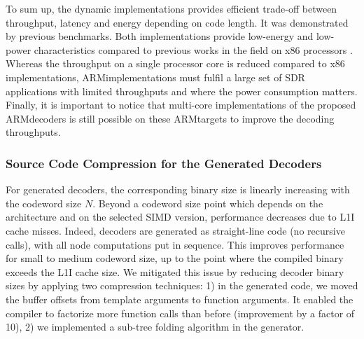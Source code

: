 To sum up, the dynamic implementations provides efficient trade-off between
throughput, latency and energy depending on code length. It was demonstrated by
previous benchmarks. Both implementations provide low-energy and low-power
characteristics compared to previous works in the field on x86 processors
\cite{Sarkis2014,Giard2014,Sarkis2014a,LeGal2014,LeGal2015a,Cassagne2015c}.
Whereas the throughput on a single processor core is reduced compared to x86
implementations, ARM\R implementations must fulfil a large set of SDR
applications with limited throughputs and where the power consumption matters.
Finally, it is important to notice that multi-core implementations of the
proposed ARM\R decoders is still possible on these ARM\R targets to improve the
decoding throughputs.

\subsubsection{Source Code Compression for the Generated Decoders}

For generated decoders, the corresponding binary size is linearly increasing
with the codeword size $N$. Beyond a codeword size point which depends on the
architecture and on the selected SIMD version, performance decreases due to L1I
cache misses. Indeed, decoders are generated as straight-line code (no recursive
calls), with all node computations put in sequence. This improves performance
for small to medium codeword size, up to the point where  the compiled binary
exceeds the L1I cache size.
We mitigated this issue by reducing decoder binary sizes by applying two
compression techniques: 1) in the generated code, we moved the buffer offsets
from template arguments to function arguments. It enabled the compiler to
factorize more function calls than before (improvement by a factor of 10), 2) we
implemented a sub-tree folding algorithm in the generator.

